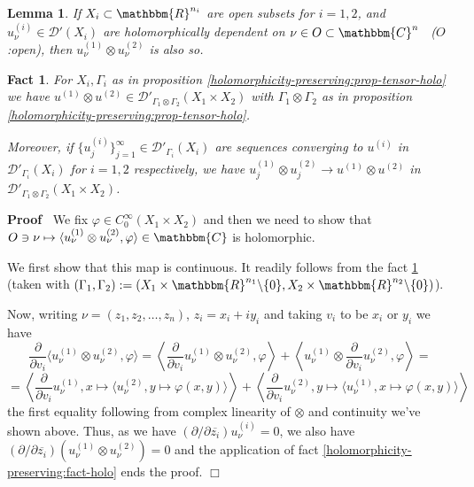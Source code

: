 \documentclass{article}
\newcommand{\assign}{:=}
\renewenvironment{proof}{\noindent\textbf{Proof\ }}{\hspace*{\fill}$\Box$\medskip}
\newtheorem{lemma}[proposition]{Lemma}
\newtheorem{fact}[proposition]{Fact}
\theoremstyle{remark}
\begin{document}
\begin{lemma}
  \label{holomorphicity-preserving:lem-tensor-holo}If $X_i \subset
  \mathbbm{R}^{n_i}$ are open subsets for $i = 1, 2$, and $u^{(i)}_{\nu} \in
  \mathcal{D}' (X_i)$ are holomorphically dependent on $\nu \in O \subset
  \mathbbm{C}^n$ \ ($O$:open), then $u_{\nu}^{(1)} \otimes u^{(2)}_{\nu}$ is
  also so.
\end{lemma}

\begin{fact}
\label{holomorphicity-preserving:fact-p1}{\cite[p. 511, rmk.
2.5]{chazarain2011introduction}} For $X_i, \Gamma_i$ as in proposition
\ref{holomorphicity-preserving:prop-tensor-holo} we have $u^{(1)} \otimes
u^{(2)} \in \mathcal{D}'_{\Gamma_1 \otimes \Gamma_2} (X_1 \times X_2)$ with
$\Gamma_1 \otimes \Gamma_2$ as in proposition
\ref{holomorphicity-preserving:prop-tensor-holo}.

Moreover, if $\{ u_j^{(i)} \}_{j = 1}^{\infty} \in \mathcal{D}'_{\Gamma_i}
(X_i)$ are sequences converging to $u^{(i)}$ in $\mathcal{D}'_{\Gamma_i}
(X_i)$ for $i = 1, 2$ respectively, we have $u_j^{(1)} \otimes u_j^{(2)}
\rightarrow u^{(1)} \otimes u^{(2)}$ in $\mathcal{D}'_{\Gamma_1 \otimes
\Gamma_2} (X_1 \times X_2)$.
\end{fact}

\begin{proof}
  We fix $\varphi \in C^{\infty}_0 (X_1 \times X_2)$ and then we need to show
  that $O \ni \nu \mapsto \langle u_{\nu}^{(1)} \otimes u_{\nu}^{(2)}, \varphi
  \rangle \in \mathbbm{C}$ is holomorphic.
  
  We first show that this map is continuous. It readily follows from the fact
  \ref{holomorphicity-preserving:fact-p1} (taken with $(\Gamma_1, \Gamma_2)
  \assign (X_1 \times \mathbbm{R}^{n_1} \backslash \{ 0 \}, X_2 \times
  \mathbbm{R}^{n_2} \backslash \{ 0 \})$).
  
  Now, writing $\nu = (z_1, z_2, \ldots, z_n)$, $z_i = x_i + i y_i$ and
  taking $v_i$ to be $x_i$ or $y_i$ we have
  \[ \frac{\partial}{\partial v_i} \langle u_{\nu}^{(1)} \otimes
     u_{\nu}^{(2)}, \varphi \rangle = \left\langle \frac{\partial}{\partial
     v_i} u_{\nu}^{(1)} \otimes u_{\nu}^{(2)}, \varphi \right\rangle +
     \left\langle u_{\nu}^{(1)} \otimes \frac{\partial}{\partial v_i}
     u_{\nu}^{(2)}, \varphi \right\rangle = \]
  \[ = \left\langle \frac{\partial}{\partial v_i} u_{\nu}^{(1)}, x \mapsto
     \langle u_{\nu}^{(2)}, y \mapsto \varphi (x, y) \rangle \right\rangle
     + \left\langle \frac{\partial}{\partial v_i} u_{\nu}^{(2)}, y \mapsto
     \langle u_{\nu}^{(1)}, x \mapsto \varphi (x, y) \rangle \right\rangle
  \]
  the first equality following from complex linearity of $\otimes$ and
  continuity we've shown above. Thus, as we have $\left( \partial / \partial
  \overline{z_i} \right) u_{\nu}^{(i)} = 0$, we also have $\left( \partial /
  \partial \overline{z_i} \right) (u_{\nu}^{(1)} \otimes u_{\nu}^{(2)}) = 0$
  and the application of fact \ref{holomorphicity-preserving:fact-holo} ends
  the proof.
\end{proof}
\end{document}
